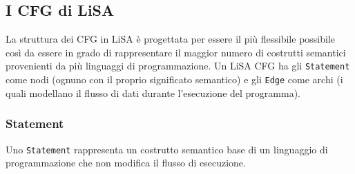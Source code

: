 \subsection{I CFG di LiSA}
La struttura dei CFG in LiSA è progettata per essere il più flessibile possibile così da essere in grado di rappresentare il maggior numero di costrutti semantici provenienti da più linguaggi di programmazione. Un LiSA CFG ha gli \texttt{Statement} come nodi (ognuno con il proprio significato semantico) e gli \texttt{Edge} come archi (i quali modellano il flusso di dati durante l'esecuzione del programma). 

\subsubsection{Statement}
Uno \texttt{Statement} rappresenta un costrutto semantico base di un linguaggio di programmazione che non modifica il flusso di esecuzione.  

